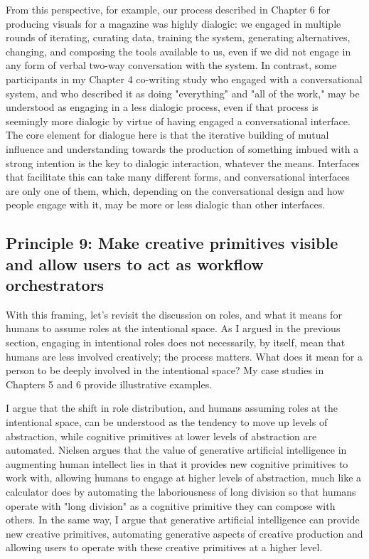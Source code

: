 From this perspective, for example, our process described in Chapter 6 for producing visuals for a magazine was highly dialogic: we engaged in multiple rounds of iterating, curating data, training the system, generating alternatives, changing, and composing the tools available to us, even if we did not engage in any form of verbal two-way conversation with the system. In contrast, some participants in my Chapter 4 co-writing study who engaged with a conversational system, and who described it as doing "everything" and "all of the work," may be understood as engaging in a less dialogic process, even if that process is seemingly more dialogic by virtue of having engaged a conversational interface. The core element for dialogue here is that the iterative building of mutual influence and understanding towards the production of something imbued with a strong intention is the key to dialogic interaction, whatever the means. Interfaces that facilitate this can take many different forms, and conversational interfaces are only one of them, which, depending on the conversational design and how people engage with it, may be more or less dialogic than other interfaces.


\subsection{Principle 9: Make creative primitives visible and allow users to act as workflow orchestrators}

With this framing, let's revisit the discussion on roles, and what it means for humans to assume roles at the intentional space. As I argued in the previous section, engaging in intentional roles does not necessarily, by itself, mean that humans are less involved creatively; the process matters. What does it mean for a person to be deeply involved in the intentional space? My case studies in Chapters 5 and 6 provide illustrative examples.

I argue that the shift in role distribution, and humans assuming roles at the intentional space, can be understood as the tendency to move up levels of abstraction, while cognitive primitives at lower levels of abstraction are automated. Nielsen argues that the value of generative artificial intelligence in augmenting human intellect lies in that it provides new cognitive primitives to work with, allowing humans to engage at higher levels of abstraction, much like a calculator does by automating the laboriousness of long division so that humans operate with "long division" as a cognitive primitive they can compose with others. In the same way, I argue that generative artificial intelligence can provide new creative primitives, automating generative aspects of creative production and allowing users to operate with these creative primitives at a higher level.


